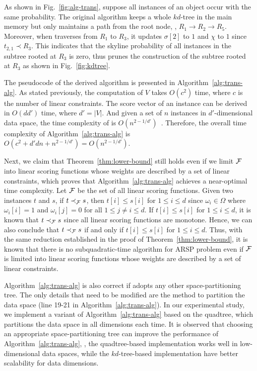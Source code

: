 \begin{example}
	As shown in Fig.~\ref{fig:alg-trans}, suppose all instances of an object occur with the same probability.
    The original algorithm keeps a whole $kd$-tree in the main memory but \skyprob only maintains a path from the root node, \eg, $R_1 \to R_2 \to R_5$.
	Moreover, when \skyprob traverses from $R_1$ to $R_3$, it updates $\sigma[2]$ to $1$ and $\chi$ to $1$ since $t_{2,1} \prec R_3$.
	This indicates that the skyline probability of all instances in the subtree rooted at $R_3$ is zero, thus \skyprob prunes the construction of the subtree rooted at $R_3$ as shown in Fig.~\ref{fig:kdtree}.
\end{example}

The pseudocode of the derived algorithm is presented in Algorithm~\ref{alg:trans-alg}.
As stated previously, the computation of $V$ takes $O(c^2)$ time, where $c$ is the number of linear constraints.
The score vector of an instance can be derived in $O(dd')$ time, where $d' = |V|$.
And given a set of $n$ instances in $d'$-dimensional data space, the time complexity of \skyprob is $O(n^{2-1/d'})$~\cite{DBLP:journals/mst/AfshaniAALP13}.
Therefore, the overall time complexity of Algorithm~\ref{alg:trans-alg} is $O(c^2 + d'dn + n^{2-1/d'}) = O(n^{2-1/d'})$.

Next, we claim that Theorem~\ref{thm:lower-bound} still holds even if we limit $\mathcal{F}$ into linear scoring functions whose weights are described by a set of linear constraints, which proves that Algorithm~\ref{alg:trans-alg} achieves a near-optimal time complexity.
Let $\mathcal{F}$ be the set of all linear scoring functions.
Given two instances $t$ and $s$, if $t \prec_{\mathcal{F}} s$, then $t[i] \le s[i]$ for $1 \le i \le d$ since $\omega_i \in \Omega$ where $\omega_i[i] = 1$ and $\omega_i[j] = 0$ for all $1 \le j \ne i \le d$.
If $t[i] \le s[i]$ for $1 \le i \le d$, it is known that $t \prec_{\mathcal{F}} s$ since all linear scoring functions are monotone.
Hence, we can also conclude that $t \prec_{\mathcal{F}} s$ if and only if $t[i] \le s[i]$ for $1 \le i \le d$.
Thus, with the same reduction established in the proof of Theorem~\ref{thm:lower-bound}, it is known that there is no subquadratic-time algorithm for ARSP problem even if $\mathcal{F}$ is limited into linear scoring functions whose weights are described by a set of linear constraints.

Algorithm~\ref{alg:trans-alg} is also correct if \skyprob adopts any other space-partitioning tree.
The only details that need to be modified are the method to partition the data space (line 19-21 in Algorithm~\ref{alg:trans-alg}).
In our experimental study, we implement a variant of Algorithm~\ref{alg:trans-alg} based on the quadtree, which partitions the data space in all dimensions each time.
It is observed that choosing an appropriate space-partitioning tree can improve the performance of Algorithm~\ref{alg:trans-alg}, \eg, the quadtree-based implementation works well in low-dimensional data spaces, while the $kd$-tree-based implementation have better scalability for data dimensions.


